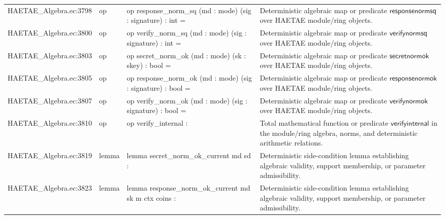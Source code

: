 \documentclass[10pt]{article}
\begin{document}
\begin{longtable}{L{0.11\textwidth}L{0.055\textwidth}L{0.385\textwidth}L{0.41\textwidth}}
HAETAE\_\allowbreak{}Algebra.\allowbreak{}ec:\allowbreak{}3798 & op & {\ttfamily\scriptsize op response\_\allowbreak{}norm\_\allowbreak{}sq (md : mode) (sig : signature) : int =} & Deterministic algebraic map or predicate $\mathsf{responsenormsq}$ over HAETAE module/ring objects. \\
HAETAE\_\allowbreak{}Algebra.\allowbreak{}ec:\allowbreak{}3800 & op & {\ttfamily\scriptsize op verify\_\allowbreak{}norm\_\allowbreak{}sq (md : mode) (sig : signature) : int =} & Deterministic algebraic map or predicate $\mathsf{verifynormsq}$ over HAETAE module/ring objects. \\
HAETAE\_\allowbreak{}Algebra.\allowbreak{}ec:\allowbreak{}3803 & op & {\ttfamily\scriptsize op secret\_\allowbreak{}norm\_\allowbreak{}ok (md : mode) (sk : skey) : bool =} & Deterministic algebraic map or predicate $\mathsf{secretnormok}$ over HAETAE module/ring objects. \\
HAETAE\_\allowbreak{}Algebra.\allowbreak{}ec:\allowbreak{}3805 & op & {\ttfamily\scriptsize op response\_\allowbreak{}norm\_\allowbreak{}ok (md : mode) (sig : signature) : bool =} & Deterministic algebraic map or predicate $\mathsf{responsenormok}$ over HAETAE module/ring objects. \\
HAETAE\_\allowbreak{}Algebra.\allowbreak{}ec:\allowbreak{}3807 & op & {\ttfamily\scriptsize op verify\_\allowbreak{}norm\_\allowbreak{}ok (md : mode) (sig : signature) : bool =} & Deterministic algebraic map or predicate $\mathsf{verifynormok}$ over HAETAE module/ring objects. \\
HAETAE\_\allowbreak{}Algebra.\allowbreak{}ec:\allowbreak{}3810 & op & {\ttfamily\scriptsize op verify\_\allowbreak{}internal :} & Total mathematical function or predicate $\mathsf{verifyinternal}$ in the module/ring algebra, norms, and deterministic arithmetic relations. \\
HAETAE\_\allowbreak{}Algebra.\allowbreak{}ec:\allowbreak{}3819 & lemma & {\ttfamily\scriptsize lemma secret\_\allowbreak{}norm\_\allowbreak{}ok\_\allowbreak{}current md sd :} & Deterministic side-condition lemma establishing algebraic validity, support membership, or parameter admissibility. \\
HAETAE\_\allowbreak{}Algebra.\allowbreak{}ec:\allowbreak{}3823 & lemma & {\ttfamily\scriptsize lemma response\_\allowbreak{}norm\_\allowbreak{}ok\_\allowbreak{}current md sk m ctx coins :} & Deterministic side-condition lemma establishing algebraic validity, support membership, or parameter admissibility. \\

\end{longtable}
\end{document}
